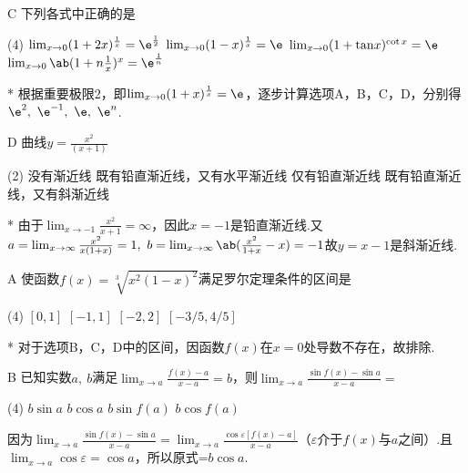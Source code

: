 \begin{choice}{C}
        下列各式中正确的是
\begin{tasks}(4)
        \task $\lim_{x\to0}(1+2x)^\frac{1}{x}=\e^\frac12$
        \task $ \lim_{x\to0}(1-x)^{\frac{1}{x}}=\e$
        \task $\lim_{x\to0}(1+\mathrm{\tan} x)^{\cot x}=\e$
        \task $\lim_{x\to 0}\ab(1+n\frac{1}{x})^{x}=\e^{\frac{1}{n}}$
\end{tasks}
\end{choice}
\begin{solution}*
        根据重要极限2，即$\lim_{x \to 0}(1+x)^{\frac{1}{x}}=\e$，逐步计算选项A，B，C，D，分别得$\e^2,\ \e^{-1},\ \e,\ \e^n$.
\end{solution}


\begin{choice}{D}
        曲线$y=\frac{x^2}{(x+1)}$
\begin{tasks}(2)
        \task 没有渐近线
        \task 既有铅直渐近线，又有水平渐近线
        \task 仅有铅直渐近线
        \task 既有铅直渐近线，又有斜渐近线
\end{tasks}
\end{choice}
\begin{solution}*
        由于$\lim_{x \to -1 }\frac{x^2}{x+1}=\infty$，因此$x=-1$是铅直渐近线.又$a=\lim_{x \to \infty }\frac{x^2}{x(1+x)}=1,\ b=\lim_{x \to\infty  }\ab(\frac{x^2}{1+x}-x)=-1$故$y=x-1$是斜渐近线.
\end{solution}

\begin{choice}{A}
        使函数$f(x)=\sqrt[3]{x^2(1-x)^2}$满足罗尔定理条件的区间是
\begin{tasks}(4)
        \task $[0,1]$
        \task $[-1,1]$
        \task $[-2,2]$
        \task $[-3/5,4/5]$
\end{tasks}
\end{choice}
\begin{solution}*
        对于选项B，C，D中的区间，因函数$f(x)$在$x=0$处导数不存在，故排除.
\end{solution}

\begin{choice}{B}
        已知实数$a,\ b$满足$\lim_{x\to a}\frac{f(x)-a}{x-a}=b$，则$\lim_{x\to a}\frac{\sin f(x)-\sin a}{x-a}=$
\begin{tasks}(4)
        \task $b\sin a$
        \task $b\cos a$ 
        \task $b\sin f(a)$
        \task $b\cos f(a)$ 
\end{tasks}
\end{choice}
\begin{solution}
        因为$\lim_{x\to a}\frac{\sin f(x)-\sin a}{x-a}=\lim_{x\to a}\frac{\cos\varepsilon [f(x)-a]}{x-a}$（$\varepsilon$介于$f(x)$与$a$之间）.且$\lim_{x\to a}\cos \varepsilon=\cos a$，所以原式=$b\cos a$.
\end{solution}

